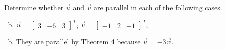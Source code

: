 \documentclass[../main.tex]{subfiles}
\begin{document}
Determine whether $\vec{u}$ and $\vec{v}$ are parallel in each of the following cases.
\begin{enumerate}[a)]
	\setcounter{enumi}{1}
	\item $\vec{u} = \begin{bmatrix}3&-6&3\end{bmatrix}^T$; $\vec{v} = \begin{bmatrix}-1&2&-1\end{bmatrix}^T$;
\end{enumerate}

\solution
\begin{enumerate}[a)]
	\setcounter{enumi}{1}
	\item They are parallel by Theorem 4 because $\vec{u} = -3\vec{v}$.
\end{enumerate}
\end{document}
